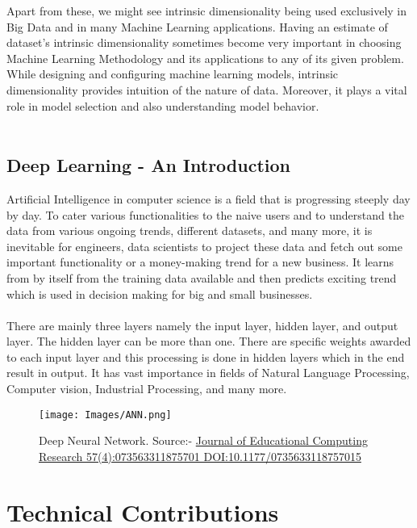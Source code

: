 \documentclass[12pt,letterpaper]{report}
\begin{document}
Apart from these, we might see intrinsic dimensionality being used exclusively in Big Data and in many Machine Learning applications. Having an estimate of dataset's intrinsic dimensionality sometimes become very important in choosing Machine Learning Methodology and its applications to any of its given problem. While designing and configuring machine learning models, intrinsic dimensionality provides intuition of the nature of data. Moreover, it plays a vital role in model selection and also understanding model behavior. \\\\

\section{Deep Learning - An Introduction}
Artificial Intelligence in computer science is a field that is progressing steeply day by day. To cater various functionalities to the naive users and to understand the data from various ongoing trends, different datasets, and many more, it is inevitable for engineers, data scientists to project these data and fetch out some important functionality or a money-making trend for a new business.  It learns from by itself from the training data available and then predicts exciting trend which is used in decision making for big and small businesses\cite{7}. \\\\

There are mainly three layers namely the input layer, hidden layer, and output layer. The hidden layer can be more than one. There are specific weights awarded to each input layer and this processing is done in hidden layers which in the end result in output\cite{8}. It has vast importance in fields of Natural Language Processing, Computer vision, Industrial Processing, and many more. 

\begin{figure}[h]
    \centering
    \texttt{[image: Images/ANN.png]}
    \caption{Deep Neural Network. Source:- \href{https://www.researchgate.net/figure/Deep-learning-diagram_fig5_323784695}{Journal of Educational Computing Research 57(4):073563311875701
DOI:10.1177/0735633118757015}} 
    \label{fig:Deep Neural Network}
\end{figure}

\chapter{Technical Contributions}
\end{document}
